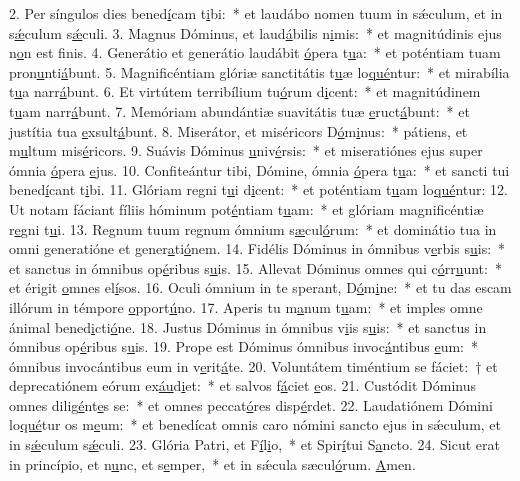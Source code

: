 2. Per síngulos dies bened\uline{í}cam t\uline{i}bi:~* et laudábo nomen tuum in sǽculum, et in s\uline{ǽ}culum s\uline{ǽ}culi.
3. Magnus Dóminus, et laud\uline{á}bilis n\uline{i}mis:~* et magnitúdinis ejus n\uline{o}n est f\uline{i}nis.
4. Generátio et generátio laudábit \uline{ó}pera t\uline{u}a:~* et poténtiam tuam pron\uline{u}nti\uline{á}bunt.
5. Magnificéntiam glóriæ sanctitátis t\uline{u}æ lo\uline{qué}ntur:~* et mirabília t\uline{u}a narr\uline{á}bunt.
6. Et virtútem terribílium tu\uline{ó}rum d\uline{i}cent:~* et magnitúdinem t\uline{u}am narr\uline{á}bunt.
7. Memóriam abundántiæ suavitátis tuæ \uline{e}ruct\uline{á}bunt:~* et justítia tua \uline{e}xsult\uline{á}bunt.
8. Miserátor, et miséricors D\uline{ó}m\uline{i}nus:~* pátiens, et m\uline{u}ltum mis\uline{é}ricors.
9. Suávis Dóminus \uline{u}niv\uline{é}rsis:~* et miseratiónes ejus super ómnia \uline{ó}pera \uline{e}jus.
10. Confiteántur tibi, Dómine, ómnia \uline{ó}pera t\uline{u}a:~* et sancti tui bened\uline{í}cant t\uline{i}bi.
11. Glóriam regni t\uline{u}i d\uline{i}cent:~* et poténtiam t\uline{u}am lo\uline{qué}ntur:
12. Ut notam fáciant fíliis hóminum pot\uline{é}ntiam t\uline{u}am:~* et glóriam magnificéntiæ r\uline{e}gni t\uline{u}i.
13. Regnum tuum regnum ómnium s\uline{æ}cul\uline{ó}rum:~* et dominátio tua in omni generatióne et gener\uline{a}ti\uline{ó}nem.
14. Fidélis Dóminus in ómnibus v\uline{e}rbis s\uline{u}is:~* et sanctus in ómnibus op\uline{é}ribus s\uline{u}is.
15. Allevat Dóminus omnes qui c\uline{ó}rr\uline{u}unt:~* et érigit \uline{o}mnes el\uline{í}sos.
16. Oculi ómnium in te sperant, D\uline{ó}m\uline{i}ne:~* et tu das escam illórum in témpore \uline{o}pport\uline{ú}no.
17. Aperis tu m\uline{a}num t\uline{u}am:~* et imples omne ánimal bened\uline{i}cti\uline{ó}ne.
18. Justus Dóminus in ómnibus v\uline{i}is s\uline{u}is:~* et sanctus in ómnibus op\uline{é}ribus s\uline{u}is.
19. Prope est Dóminus ómnibus invoc\uline{á}ntibus \uline{e}um:~* ómnibus invocántibus eum in v\uline{e}rit\uline{á}te.
20. Voluntátem timéntium se fáciet:~† et deprecatiónem eórum ex\uline{áu}d\uline{i}et:~* et salvos f\uline{á}ciet \uline{e}os.
21. Custódit Dóminus omnes dilig\uline{é}nt\uline{e}s se:~* et omnes peccat\uline{ó}res disp\uline{é}rdet.
22. Laudatiónem Dómini lo\uline{qué}tur os m\uline{e}um:~* et benedícat omnis caro nómini sancto ejus in sǽculum, et in s\uline{ǽ}culum s\uline{ǽ}culi.
23. Glória Patri, et F\uline{í}l\uline{i}o,~* et Spir\uline{í}tui S\uline{a}ncto.
24. Sicut erat in princípio, et n\uline{u}nc, et s\uline{e}mper,~* et in sǽcula sæcul\uline{ó}rum. \uline{A}men.
